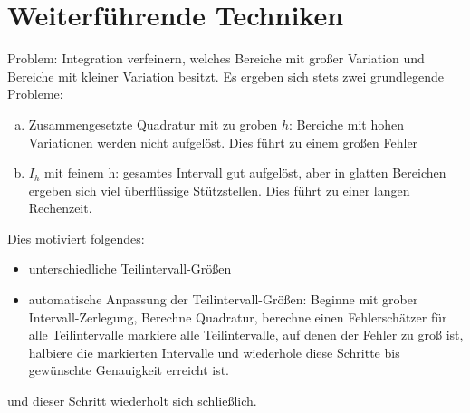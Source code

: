 \documentclass[11pt]{scrbook}
\begin{document}
\section{Weiterführende Techniken}
\begin{seg}
	Problem: Integration verfeinern, welches Bereiche mit großer Variation und Bereiche mit kleiner Variation besitzt. Es ergeben sich stets zwei grundlegende Probleme:
	\begin{enumerate}[a)]
		\item Zusammengesetzte Quadratur mit zu groben $h$: Bereiche mit hohen Variationen werden nicht aufgelöst. Dies führt zu einem großen Fehler
		\item $I_h$ mit feinem h: gesamtes Intervall gut aufgelöst, aber in glatten Bereichen ergeben sich viel überflüssige Stützstellen. Dies führt zu einer langen Rechenzeit.
	\end{enumerate}
\end{seg}
\begin{seg}[Idee:]
	Dies motiviert folgendes:
	\begin{itemize}
		\item unterschiedliche Teilintervall-Größen
		\item automatische Anpassung der Teilintervall-Größen: Beginne mit grober Intervall-Zerlegung, Berechne Quadratur, berechne einen Fehlerschätzer für alle Teilintervalle markiere alle Teilintervalle, auf denen der Fehler zu groß ist, halbiere die markierten Intervalle und wiederhole diese Schritte bis gewünschte Genauigkeit erreicht ist.
	\end{itemize}
\end{seg}
\begin{seg}
	\begin{figure}[ht]
\end{figure}
und dieser Schritt wiederholt sich schließlich.
\end{seg}
\end{document}

